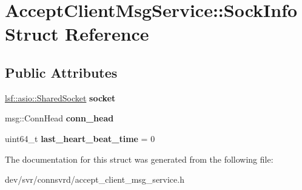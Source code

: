 \hypertarget{structAcceptClientMsgService_1_1SockInfo}{
\section{AcceptClientMsgService::SockInfo Struct Reference}
\label{structAcceptClientMsgService_1_1SockInfo}
}
\subsection*{Public Attributes}
\begin{DoxyCompactItemize}
\item 
\hypertarget{structAcceptClientMsgService_1_1SockInfo_a8d659a6069dac7f7d960b90d2492cbbe}{
\hyperlink{classlsf_1_1asio_1_1SharedSocket}{lsf::asio::SharedSocket} {\bfseries socket}}
\label{structAcceptClientMsgService_1_1SockInfo_a8d659a6069dac7f7d960b90d2492cbbe}

\item 
\hypertarget{structAcceptClientMsgService_1_1SockInfo_a028c5c0de7e12ac5764bfe3fa01d9a3b}{
msg::ConnHead {\bfseries conn\_\-head}}
\label{structAcceptClientMsgService_1_1SockInfo_a028c5c0de7e12ac5764bfe3fa01d9a3b}

\item 
\hypertarget{structAcceptClientMsgService_1_1SockInfo_acdfd0abb7c101d3b07d1105958090364}{
uint64\_\-t {\bfseries last\_\-heart\_\-beat\_\-time} = 0}
\label{structAcceptClientMsgService_1_1SockInfo_acdfd0abb7c101d3b07d1105958090364}

\end{DoxyCompactItemize}


The documentation for this struct was generated from the following file:\begin{DoxyCompactItemize}
\item 
dev/svr/connsvrd/accept\_\-client\_\-msg\_\-service.h\end{DoxyCompactItemize}
